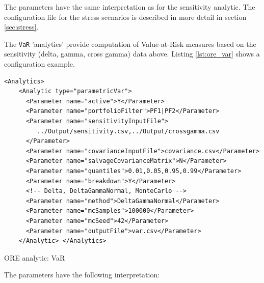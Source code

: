 \documentclass[12pt, a4paper]{article}
\begin{document}
The parameters have the same interpretation as for the sensitivity analytic. The configuration file for the stress
scenarios is described in more detail in section \ref{sec:stress}.

\medskip The {\tt VaR} 'analytics' provide computation of Value-at-Risk measures based on the sensitivity (delta, gamma, cross gamma) data above. Listing \ref{lst:ore_var} shows a configuration example.

\begin{listing}[H]
\begin{verbatim}
<Analytics>
    <Analytic type="parametricVar"> 
      <Parameter name="active">Y</Parameter> 
      <Parameter name="portfolioFilter">PF1|PF2</Parameter>
      <Parameter name="sensitivityInputFile">
         ../Output/sensitivity.csv,../Output/crossgamma.csv
      </Parameter> 
      <Parameter name="covarianceInputFile">covariance.csv</Parameter> 
      <Parameter name="salvageCovarianceMatrix">N</Parameter>
      <Parameter name="quantiles">0.01,0.05,0.95,0.99</Parameter> 
      <Parameter name="breakdown">Y</Parameter> 
      <!-- Delta, DeltaGammaNormal, MonteCarlo --> 
      <Parameter name="method">DeltaGammaNormal</Parameter> 
      <Parameter name="mcSamples">100000</Parameter> 
      <Parameter name="mcSeed">42</Parameter> 
      <Parameter name="outputFile">var.csv</Parameter> 
    </Analytic> </Analytics>
\end{verbatim}
\caption{ORE analytic: VaR}
\label{lst:ore_var}
\end{listing}

The parameters have the following interpretation:
\end{document}
